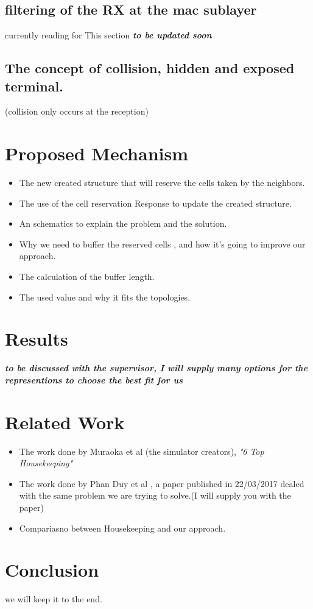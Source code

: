 \documentclass[a4paper,10pt]{article}
\begin{document}
\subsection{filtering of the RX at the mac sublayer}
currently reading for This section \textbf{\textit{to be updated soon}}
\subsection{The concept of collision, hidden and exposed terminal.}
(collision only occurs at the reception)
\section{Proposed Mechanism}
\begin{itemize}
  \item The new created structure that will reserve the cells taken by the neighbors. 
  \item The use of the cell reservation Response to update the created structure.
  \item An schematics to explain the problem and the solution.
  \item Why we need to buffer the reserved cells , and how it's going to improve our approach. 
  \item The calculation of the buffer length. 
  \item The used value and why it fits the topologies.
  \end{itemize}
\section{Results}
\textbf{\textit{to be discussed with the supervisor, I will supply many options for the representions to choose the best fit for us}}
\section{Related Work}
\begin{itemize}
  \item The work done by Muraoka et al (the simulator creators), \textit{"6 Top Housekeeping"} 
  \item The work done by Phan Duy et al , a paper published in 22/03/2017 dealed with the same problem we are trying to solve.(I will supply you with the paper)
  \item Compariasno between Housekeeping and our approach.
  \end{itemize}  
\section{Conclusion}
  we will keep it to the end.
\end{document}
